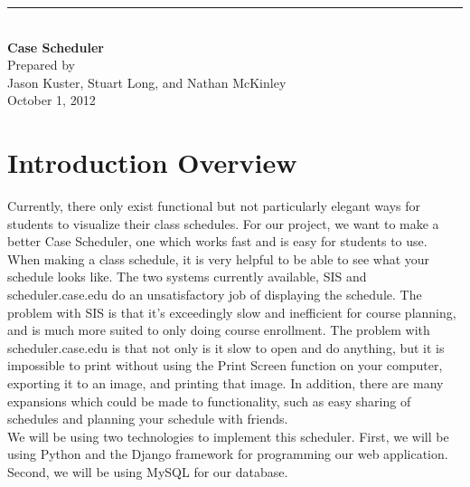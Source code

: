 \documentclass[pdftex,12pt,letter]{article}
\newcommand{\HRule}{\rule{\linewidth}{0.5mm}}
\begin{document}
\begin{titlepage}
\begin{flushright}
\HRule \\
{\huge \bfseries Case Scheduler\\[4cm]}
{\large Prepared by\\Jason Kuster, Stuart Long, and Nathan McKinley\\[1cm]
October 1, 2012}
\end{flushright}
\end{titlepage}
\tableofcontents{}
\newpage
\section*{Introduction Overview}
Currently, there only exist functional but not particularly elegant ways for students to visualize their class schedules. For our project, we want to make a better Case Scheduler, one which works fast and is easy for students to use.\\

\noindent When making a class schedule, it is very helpful to be able to see what your schedule looks like. The two systems currently available, SIS and scheduler.case.edu do an unsatisfactory job of displaying the schedule. The problem with SIS is that it's exceedingly slow and inefficient for course planning, and is much more suited to only doing course enrollment. The problem with scheduler.case.edu is that not only is it slow to open and do anything, but it is impossible to print without using the Print Screen function on your computer, exporting it to an image, and printing that image. In addition, there are many expansions which could be made to functionality, such as easy sharing of schedules and planning your schedule with friends.\\

\noindent We will be using two technologies to implement this scheduler. First, we will be using Python and the Django framework for programming our web application. Second, we will be using MySQL for our database.
\end{document}
